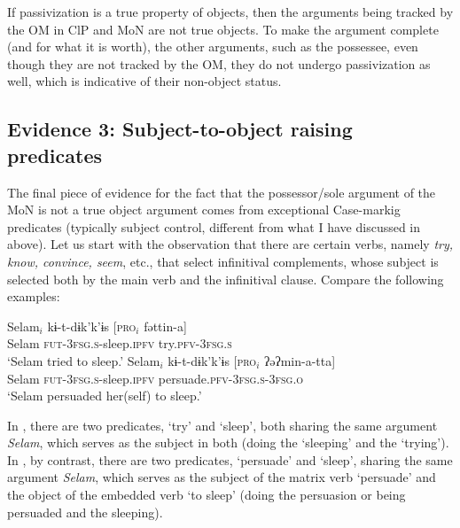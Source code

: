\documentclass[output=paper]{langscibook}
\begin{document}
\noindent If passivization is a true property of objects, then the arguments being tracked by the OM in ClP and MoN are not true objects. To make the argument complete (and for what it is worth), the other arguments, such as the possessee, even though they are not tracked by the OM, they do not undergo passivization as well, which is indicative of their non-object status.


\ea\label{ex:Gebregziabher:passive2}
\z
\z

\subsection{Evidence 3: Subject-to-object raising predicates}

The final piece of evidence for the fact that the possessor/sole argument of the MoN is not a true object argument comes from exceptional Case-markig predicates (typically subject control, different from what I have discussed in  above). Let us start with the observation that there are certain verbs, namely \emph{try, know, convince, seem}, etc., that select infinitival complements, whose subject is selected both by the main verb and the infinitival clause. Compare the following examples:


\ea\label{ex:Gebregziabher:conv}
\ea\label{ex:Gebregziabher:conv1} 
\gll Selam$_i$ kɨ-t-dɨk'k'ɨs [{\scshape pro}$_i$ fəttin-a] \\
Selam {\scshape fut-3fsg.s}-sleep.{\scshape ipfv} {} try.{\scshape pfv-3fsg.s} \\
\glt `Selam tried to sleep.'
\ex\label{ex:Gebregziabher:conv2}   
\gll Selam$_i$ kɨ-t-dɨk'k'ɨs [{\scshape pro}$_i$ ʔəʔmin-a-tta] \\
Selam {\scshape fut-3fsg.s}-sleep.{\scshape ipfv} {} persuade.{\scshape pfv-3fsg.s-3fsg.o} \\
\glt `Selam persuaded her(self) to sleep.'
\z
\z


\noindent In , there are two predicates, `try' and `sleep', both sharing the same argument \emph{Selam}, which serves as the subject in both (doing the `sleeping' and the `trying').  
In , by contrast, there are two predicates, `persuade' and `sleep', sharing the same argument \emph{Selam}, which serves as the subject of the matrix verb `persuade' and the object of the embedded verb `to sleep' (doing the persuasion or being persuaded and the sleeping).
\end{document}
